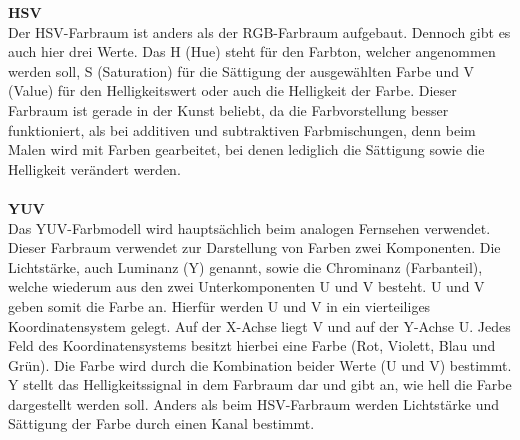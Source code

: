 \textbf{HSV}\label{s.hsv}\\
Der HSV-Farbraum ist anders als der RGB-Farbraum aufgebaut. Dennoch gibt es auch hier drei Werte. Das H (Hue) steht für den Farbton, welcher angenommen werden soll, S (Saturation) für die Sättigung der ausgewählten Farbe und V (Value) für den Helligkeitswert oder auch die Helligkeit der Farbe. Dieser Farbraum ist gerade in der Kunst beliebt, da die Farbvorstellung besser funktioniert, als bei additiven und subtraktiven Farbmischungen, denn beim Malen wird mit Farben gearbeitet, bei denen lediglich die Sättigung sowie die Helligkeit verändert werden.\\\\
\textbf{YUV}\label{s.lab}\\
Das YUV-Farbmodell wird hauptsächlich beim analogen Fernsehen verwendet. Dieser Farbraum verwendet zur Darstellung von Farben zwei Komponenten. Die Lichtstärke, auch Luminanz (Y) genannt, sowie die Chrominanz (Farbanteil), welche wiederum aus den zwei Unterkomponenten U und V besteht. U und V geben somit die Farbe an. Hierfür werden U und V in ein vierteiliges Koordinatensystem gelegt. Auf der X-Achse liegt V und auf der Y-Achse U. Jedes Feld des Koordinatensystems besitzt hierbei eine Farbe (Rot, Violett, Blau und Grün). Die Farbe wird durch die Kombination beider Werte (U und V) bestimmt. Y stellt das Helligkeitssignal in dem Farbraum dar und gibt an, wie hell die Farbe dargestellt werden soll. Anders als beim HSV-Farbraum werden Lichtstärke und Sättigung der Farbe durch einen Kanal bestimmt. 
